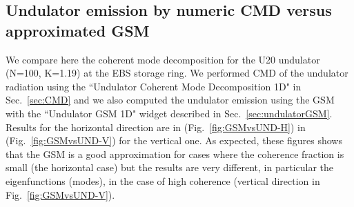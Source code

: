 \documentclass{iopconfser}
\begin{document}
\subsection{Undulator emission by numeric CMD versus approximated GSM}\label{sec:CMDvsGSM}
We compare here the coherent mode decomposition for the U20 undulator (N=100, K=1.19) at the EBS storage ring. We performed CMD of the undulator radiation using the ``Undulator Coherent Mode Decomposition 1D" in Sec.~\ref{sec:CMD} and we also computed the undulator emission using the GSM with the ``Undulator GSM 1D" widget described in Sec.~\ref{sec:undulatorGSM}. 
Results for the horizontal direction are in (Fig.~\ref{fig:GSMvsUND-H}) in (Fig.~\ref{fig:GSMvsUND-V}) for the vertical one. As expected, these figures shows that the GSM is a good approximation for cases where the coherence fraction is small (the horizontal case) but the results are very different, in particular the eigenfunctions (modes), in the case of high coherence (vertical direction in Fig.~\ref{fig:GSMvsUND-V}).
\end{document}
